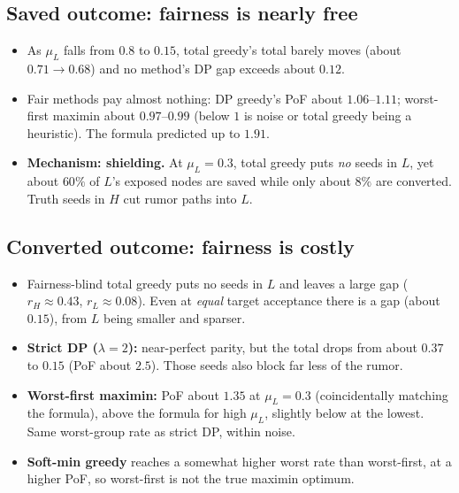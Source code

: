 \documentclass[11pt]{article}
\begin{document}
\subsection{Saved outcome: fairness is nearly free}
\begin{itemize}
\item As $\mu_L$ falls from $0.8$ to $0.15$, total greedy's total barely moves (about $0.71\to0.68$) and no method's DP gap exceeds about $0.12$.
\item Fair methods pay almost nothing: DP greedy's PoF about $1.06$--$1.11$; worst-first maximin about $0.97$--$0.99$ (below $1$ is noise or total greedy being a heuristic). The formula predicted up to $1.91$.
\item \textbf{Mechanism: shielding.} At $\mu_L=0.3$, total greedy puts \emph{no} seeds in $L$, yet about $60\%$ of $L$'s exposed nodes are saved while only about $8\%$ are converted. Truth seeds in $H$ cut rumor paths into $L$.
\end{itemize}

\subsection{Converted outcome: fairness is costly}
\begin{itemize}
\item Fairness-blind total greedy puts no seeds in $L$ and leaves a large gap ($r_H\approx0.43$, $r_L\approx0.08$). Even at \emph{equal} target acceptance there is a gap (about $0.15$), from $L$ being smaller and sparser.
\item \textbf{Strict DP ($\lambda=2$):} near-perfect parity, but the total drops from about $0.37$ to $0.15$ (PoF about $2.5$). Those seeds also block far less of the rumor.
\item \textbf{Worst-first maximin:} PoF about $1.35$ at $\mu_L=0.3$ (coincidentally matching the formula), above the formula for high $\mu_L$, slightly below at the lowest. Same worst-group rate as strict DP, within noise.
\item \textbf{Soft-min greedy} reaches a somewhat higher worst rate than worst-first, at a higher PoF, so worst-first is not the true maximin optimum.
\end{itemize}
\end{document}
